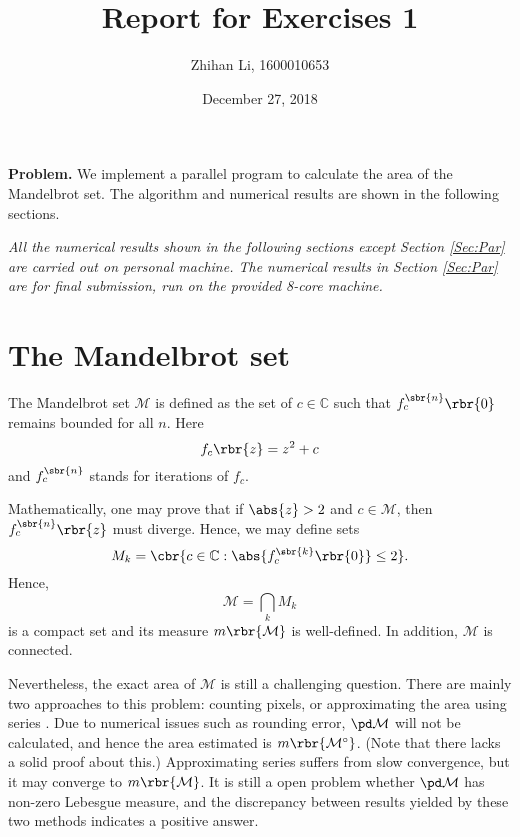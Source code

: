 \documentclass[english, nochinese]{pnote}
\title{Report for Exercises 1}
\author{Zhihan Li, 1600010653}
\date{December 27, 2018}
\begin{document}
\maketitle

\textbf{Problem.} We implement a parallel program to calculate the area of the Mandelbrot set. The algorithm and numerical results are shown in the following sections.

\emph{All the numerical results shown in the following sections except Section \ref{Sec:Par} are carried out on personal machine. The numerical results in Section \ref{Sec:Par} are for final submission, run on the provided 8-core machine.}

\section{The Mandelbrot set}

The Mandelbrot set $\mathcal{M}$ is defined as the set of $ c \in \mathbb{C} $ such that $ f_c^{\sbr{n}} \rbr{0} $ remains bounded for all $n$. Here
\begin{equation}
f_c \rbr{z} = z^2 + c
\end{equation}
and $f_c^{\sbr{n}}$ stands for iterations of $f_c$.

Mathematically, one may prove that if $ \abs{z} > 2 $ and $ c \in \mathcal{M} $, then $ f_c^{\sbr{n}} \rbr{z} $ must diverge. Hence, we may define sets
\begin{equation}
M_k = \cbr{ c \in \mathbb{C} : \abs{ f_c^{\sbr{k}} \rbr{0} } \le 2 }.
\end{equation}
Hence,
\begin{equation}
\mathcal{M} = \bigcap_k M_k
\end{equation}
is a compact set and its measure $ m \rbr{\mathcal{M}} $ is well-defined. In addition, $\mathcal{M}$ is connected.

Nevertheless, the exact area of $\mathcal{M}$ is still a challenging question. There are mainly two approaches to this problem: counting pixels, or approximating the area using series \parencite{ewing_area_1992}. Due to numerical issues such as rounding error, $ \pd \mathcal{M} $ will not be calculated, and hence the area estimated is $ m \rbr{\mathcal{M}^{\circ}} $. (Note that there lacks a solid proof about this.) Approximating series suffers from slow convergence, but it may converge to $ m \rbr{\mathcal{M}} $. It is still a open problem whether $ \pd \mathcal{M} $ has non-zero Lebesgue measure, and the discrepancy between results yielded by these two methods indicates a positive answer.
\end{document}
